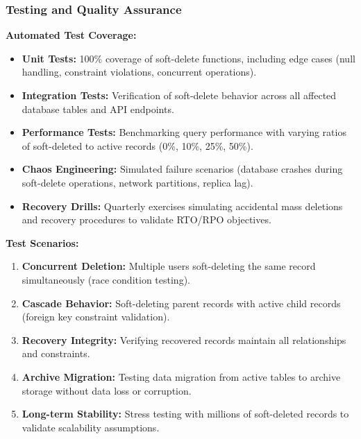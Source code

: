 \documentclass[12pt,a4paper]{article}
\begin{document}
\subsubsection{Testing and Quality Assurance}

\textbf{Automated Test Coverage:}

\begin{itemize}[leftmargin=2em, itemsep=6pt]
    \item \textbf{Unit Tests:} 100\% coverage of soft-delete functions, including edge cases (null handling, constraint violations, concurrent operations).
    \item \textbf{Integration Tests:} Verification of soft-delete behavior across all affected database tables and API endpoints.
    \item \textbf{Performance Tests:} Benchmarking query performance with varying ratios of soft-deleted to active records (0\%, 10\%, 25\%, 50\%).
    \item \textbf{Chaos Engineering:} Simulated failure scenarios (database crashes during soft-delete operations, network partitions, replica lag).
    \item \textbf{Recovery Drills:} Quarterly exercises simulating accidental mass deletions and recovery procedures to validate RTO/RPO objectives.
\end{itemize}

\vspace{0.5em}

\textbf{Test Scenarios:}

\begin{enumerate}[leftmargin=2em, itemsep=6pt]
    \item \textbf{Concurrent Deletion:} Multiple users soft-deleting the same record simultaneously (race condition testing).
    \item \textbf{Cascade Behavior:} Soft-deleting parent records with active child records (foreign key constraint validation).
    \item \textbf{Recovery Integrity:} Verifying recovered records maintain all relationships and constraints.
    \item \textbf{Archive Migration:} Testing data migration from active tables to archive storage without data loss or corruption.
    \item \textbf{Long-term Stability:} Stress testing with millions of soft-deleted records to validate scalability assumptions.
\end{enumerate}
\end{document}
